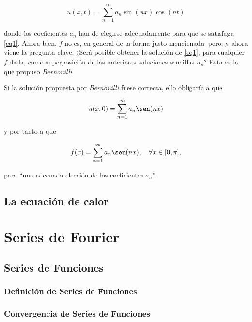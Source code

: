 \begin{equation}\label{eq4}
	u(x,t) = \sum_{n=1}^{\infty} a_n \sin(nx) \cos(nt)
\end{equation}
\newline

donde los coeficientes \( a_n \) han de elegirse adecuadamente para que se satisfaga
\ref{eq1}.
\newline
Ahora bien, \( f \) no es, en general de la forma justo mencionada, pero, y ahora 
viene la pregunta clave: ¿Será posible obtener la solución de \ref{eq1}, para cualquier 
\( f \) dada, como superposición de las anteriores soluciones sencillas \( u_n \)? Esto es
lo que propuso \textit{Bernouilli}.

Si la solución propuesta por \textit{Bernouilli} fuese correcta, ello obligaría a que

\begin{equation}\label{eq5}
	u(x, 0) = \sum_{n=1}^{\infty} a_n \sen(nx)
\end{equation}

y por tanto a que

\begin{equation}\label{eq6}
f(x) = \sum_{n=1}^{\infty} a_n \sen(nx), \quad \forall x \in [0, \pi],
\end{equation}

para “una adecuada elección de los coeficientes \( a_n \)”.


\subsection{La ecuación de calor}

\section{Series de Fourier}

\subsection{Series de Funciones}
\subsubsection{Definición de Series de Funciones}
\subsubsection{Convergencia de Series de Funciones}

